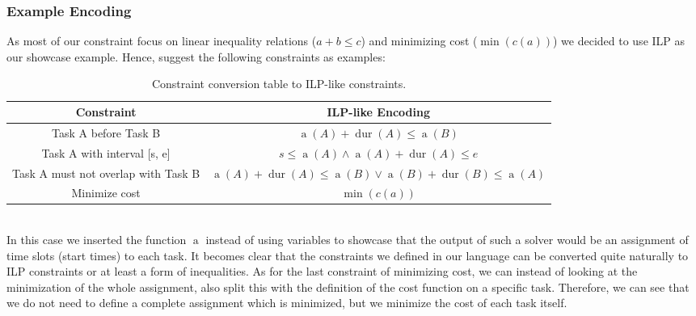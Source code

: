 \subsubsection{Example Encoding}
As most of our constraint focus on linear inequality relations ($a + b \leq c$) and minimizing cost ($\min{(c(a))}$) we decided to use \Ac{ILP} as our showcase example. Hence, suggest the following constraints as examples:
\begin{table}[!ht]
    \centering
    \begin{tabular}{|c|c|}
        \hline
        Constraint                          & \ac{ILP}-like Encoding                                                                                                                           \\
        \hline
        Task A before Task B                & $\operatorname{a}(A) + \operatorname{dur}(A) \leq \operatorname{a}(B)$                                                                           \\
        \hline
        Task A with interval [s, e]         & $s \leq \operatorname{a}(A) \land \operatorname{a}(A) + \operatorname{dur}(A) \leq e$                                                            \\
        \hline
        Task A must not overlap with Task B & $\operatorname{a}(A) + \operatorname{dur}(A) \leq \operatorname{a}(B) \lor \operatorname{a}(B) + \operatorname{dur}(B) \leq \operatorname{a}(A)$ \\
        \hline
        Minimize cost                       & $\min{(c(a))}$                                                                                                                                   \\
        \hline
    \end{tabular}
    \caption{Constraint conversion table to \ac{ILP}-like constraints.}
\end{table}\\
In this case we inserted the function $\operatorname{a}$ instead of using variables to showcase that the output of such a solver would be an assignment of time slots (start times) to each task. It becomes clear that the constraints we defined in our language can be converted quite naturally to \ac{ILP} constraints or at least a form of inequalities. As for the last constraint of minimizing cost, we can instead of looking at the minimization of the whole assignment, also split this with the definition of the cost function on a specific task. Therefore, we can see that we do not need to define a complete assignment which is minimized, but we minimize the cost of each task itself.

